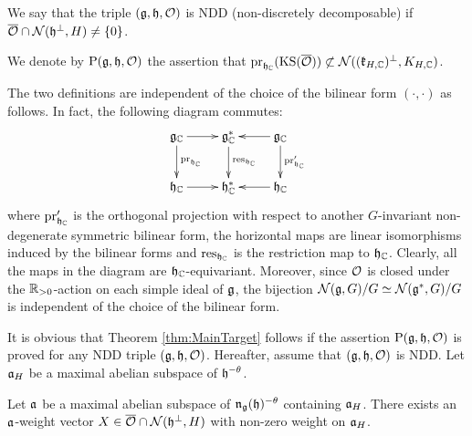 \begin{definition}
	We say that the triple $(\mathfrak{g}, \mathfrak{h}, \mathcal{O})$ is NDD (non-discretely decomposable) if $\overline{\mathcal{O}} \cap \mathcal{N}(\mathfrak{h}^\perp, H) \neq \left\{0 \right\}$.
\end{definition}

\begin{definition} \label{def:MainAssertion}
	We denote by $\mathrm{P}(\mathfrak{g}, \mathfrak{h}, \mathcal{O})$ the assertion that $\mathrm{pr}_{\mathfrak{h}_{\mathbb{C}}}(\mathrm{KS}(\overline{\mathcal{O}})) \not \subset \mathcal{N}((\mathfrak{k}_{H, \mathbb{C}})^\perp, K_{H, \mathbb{C}})$.
\end{definition}

\begin{remark}
	The two definitions are independent of the choice of the bilinear form $(\cdot, \cdot)$ as follows.
	In fact, the following diagram commutes:
	\begin{align*}
		\xymatrix{
			\lieC{g} \ar[r] \ar[d]^{\proj_{\lieC{h}}} & \lieC{g}^* \ar[d]^{\mathrm{res}_{\lieC{h}}} & \lieC{g} \ar[l] \ar[d]^{\proj'_{\lieC{h}}} \\
			\lieC{h} \ar[r] & \lieC{h}^* & \lieC{h} \ar[l],
		}
	\end{align*}
	where $\mathrm{pr}'_{\mathfrak{h}_{\mathbb{C}}}$ is the orthogonal projection with respect to another $G$-invariant non-degenerate symmetric bilinear form, the horizontal maps are linear isomorphisms induced by the bilinear forms and $\mathrm{res}_{\mathfrak{h}_{\mathbb{C}}}$ is the restriction map to $\mathfrak{h}_{\mathbb{C}}$.
	Clearly, all the maps in the diagram are $\mathfrak{h}_{\mathbb{C}}$-equivariant.
	Moreover, since $\mathcal{O}$ is closed under the $\mathbb{R}_{>0}$-action on each simple ideal of $\mathfrak{g}$, the bijection $\mathcal{N}(\mathfrak{g}, G)/G \simeq \mathcal{N}(\mathfrak{g}^*, G)/G$ is independent of the choice of the bilinear form.
\end{remark}

It is obvious that Theorem \ref{thm:MainTarget} follows if the assertion $\mathrm{P}(\mathfrak{g}, \mathfrak{h}, \mathcal{O})$ is proved for any NDD triple $(\mathfrak{g}, \mathfrak{h}, \mathcal{O})$.
Hereafter, assume that $(\mathfrak{g}, \mathfrak{h}, \mathcal{O})$ is NDD.
Let $\mathfrak{a}_H$ be a maximal abelian subspace of $\mathfrak{h}^{-\theta}$.

\begin{lemma}\label{lem:ExistenceWeightVector}
	Let $\mathfrak{a}$ be a maximal abelian subspace of $\mathfrak{n}_{\mathfrak{g}}(\mathfrak{h})^{-\theta}$ containing $\mathfrak{a}_H$.
	There exists an $\mathfrak{a}$-weight vector $X \in \overline{\mathcal{O}} \cap \mathcal{N}(\mathfrak{h}^\perp, H)$ with non-zero weight on $\mathfrak{a}_H$.
\end{lemma}

